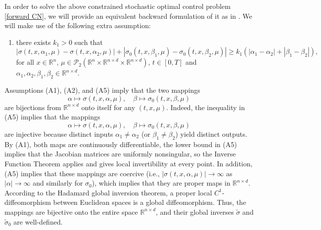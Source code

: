\documentclass[11pt,a4paper]{article}
\begin{document}
In order to solve the above constrained stochastic optimal control problem \eqref{forward CN}, we will provide an equivalent backward formulation of it as in \cite{Karoui Peng,Ji Zhou}. We will make use of the following extra assumption:
\begin{enumerate}
\item[(A5)] there exists $k_1 >0$ such that 
\[ |\sigma(t,x, \alpha_1, \mu)-\sigma(t,x, \alpha_2, \mu)| + |\sigma_0(t,x, \beta_1, \mu)-\sigma_0(t,x, \beta_2, \mu)| \geq k_1(|\alpha_1-\alpha_2| + |\beta_1-\beta_2|),\] 
for all $ x \in \mathbb{R}^n$, $\mu \in \mathcal{P}_2(\mathbb R^n \times \mathbb R^{n\times d} \times \mathbb R^{n\times d})$, $t \in [0,T]$ and $\alpha_1, \alpha_2, \beta_1,\beta_2 \in \mathbb{R}^{n \times d}$.

\end{enumerate}
Assumptions (A1), (A2), and (A5) imply
that the two mappings 
\[
\alpha \mapsto \sigma(t,x, \alpha, \mu), \quad 
\beta \mapsto \sigma_0(t,x, \beta, \mu)
\]
are  bijections from $\mathbb{R}^{n\times d}$ onto itself for any $(t,x, \mu)$.
Indeed, the inequality in (A5) implies that the mappings
\[
\alpha \mapsto \sigma(t,x,\alpha,\mu), \quad \beta \mapsto \sigma_0(t,x,\beta,\mu)
\]
are injective because distinct inputs \(\alpha_1 \neq \alpha_2\) (or \(\beta_1 \neq \beta_2\)) yield distinct outputs.  By (A1), both maps are continuously differentiable, the  lower bound in (A5) implies that the Jacobian matrices are uniformly nonsingular, so the Inverse Function Theorem applies and gives local invertibility at every point. 
In addition, (A5) implies that these mappings are coercive (i.e., $|\sigma(t,x,\alpha,\mu)| \to \infty$ as $|\alpha| \to \infty$ and similarly for $\sigma_0$), which implies that they are proper maps in $\mathbb{R}^{n \times d}$. According to the Hadamard global inversion theorem, a proper local $C^1$-diffeomorphism between Euclidean spaces is a global diffeomorphism. Thus, the mappings are bijective onto the entire space $\mathbb{R}^{n \times d}$, and their global inverses $\tilde{\sigma}$ and $\tilde{\sigma}_0$ are well-defined.

\medskip
\end{document}
